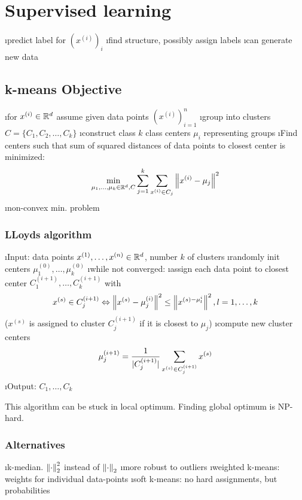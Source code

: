 \section{Supervised learning}

\bi
\i predict label for $(x^{(i)})_i$
\i find structure, possibly assign labels
\i can generate new data
\ei

\subsection{k-means Objective}

\bi
\i for $x^{(i)} \in \mathbb{R}^d$ assume given data points $(x^{(i)})^n_{i=1}$
\i group into clusters $C = \{C_1, C_2, \ldots, C_k\}$
\i construct class $k$ class centers $\mu_i$ representing groups
\i Find centers such that sum of squared distances of data points to closest center is minimized: \[
\min_{\mu_1, \ldots, \mu_k \in \mathbb{R}^d, C} \displaystyle\sum_{j=1}^k \displaystyle\sum_{x^{(i)} \in C_j} \left\lVert x^{(i)} - \mu_j\right\rVert^2
\]
\i non-convex min. problem
\ei

\subsubsection{LLoyds algorithm}

\be
\i Input: data points $x^{(1)}, \ldots, x^{(n)} \in \mathbb{R}^d$, number $k$ of clusters
\i randomly init centers $\mu^{(0)}_1,\ldots,\mu^{(0)}_k$
\i while not converged:
\be
\i assign each data point to closest center $C^{(i+1)}_1, \ldots, C^{(i+1)}_k$ with \[
x^{(s)} \in C^{(i+1)}_j \Leftrightarrow \left\lVert x^{(s)} - \mu_j^{(i)}\right\rVert^2 \leq \left\lVert x^{(s) - \mu_l^{i}}\right\rVert^2, l = 1, \ldots, k
\] ($x^{(s)}$ is assigned to cluster $C^{(i+1)}_j$ if it is closest to $\mu_j$)
\i compute new cluster centers \[
\mu_j^{(i+1)} = \frac{1}{\vert C^{(i+1)}_j \vert} \displaystyle\sum_{x^{(s)} \in C^{(i+1)}_j} x^{(s)}
\]
\ee
\i Output: $C_1, \ldots, C_k$
\ee

This algorithm can be stuck in local optimum. Finding global optimum is NP-hard.

\subsubsection{Alternatives}

\bi
\i k-median. $\left\lVert\cdot\right\rVert_2^2$ instead of $\left\lVert\cdot\right\rVert_2$
\bi
\i more robust to outliers
\ei
\i weighted k-means: weights for individual data-points
\i soft k-means: no hard assignments, but probabilities
\ei

